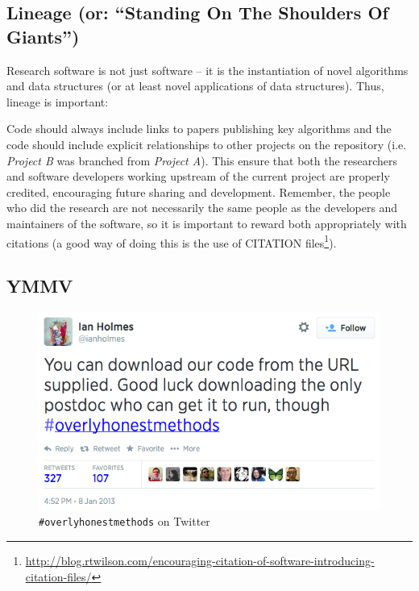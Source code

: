 \documentclass[a4paper,11pt]{article}
\begin{document}
\subsection{Lineage (or: ``Standing On The Shoulders Of Giants'')} 

Research software is not just software -- it is the instantiation of
novel algorithms and data structures (or at least novel applications
of data structures). Thus, lineage is important:

 Code should always
include links to papers publishing key algorithms and the code should
include explicit relationships to other projects on the repository
(i.e. {\emph{Project B}} was branched from {\emph{Project A}}). This
ensure that both the researchers and software developers working
upstream of the current project are properly credited, encouraging
future sharing and development. Remember, the people who did the
research are not necessarily the same people as the developers and
maintainers of the software, so it is important to reward both
appropriately with citations (a good way of doing this is the use of
CITATION
files\footnote{\url{http://blog.rtwilson.com/encouraging-citation-of-software-introducing-citation-files/}}).

\subsection{YMMV}

\begin{figure}[!ht]
\centering
\includegraphics[width=0.9\columnwidth]{images/overlyhonesttweet.png}
\caption{{\texttt{\#overlyhonestmethods}} on Twitter}
\label{fig:overlyhonestmethod} 
\end{figure}
\end{document}
